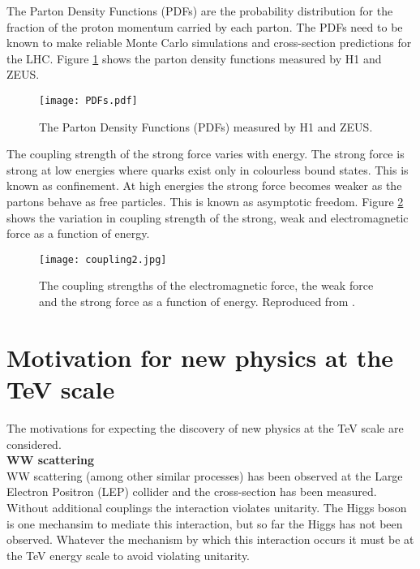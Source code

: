 The Parton Density Functions (PDFs) are the probability distribution for the
fraction of the proton momentum carried by each parton. The PDFs need to be
known to make reliable Monte Carlo simulations and cross-section predictions for 
the LHC. Figure \ref{fig:pdfs} shows the parton density functions measured by H1 and
ZEUS. \\

\begin{figure}
\begin{center}
\texttt{[image: PDFs.pdf]}
\end{center}
\caption{The Parton Density Functions (PDFs) measured by H1 and ZEUS.}
\label{fig:pdfs}
\end{figure}

The coupling strength of the strong force varies with energy. The strong force 
is strong at low energies where quarks exist only in colourless bound states. 
This is known as confinement. At high energies the strong force becomes weaker 
as the partons behave as free particles. This is known as asymptotic freedom. 
Figure \ref{fig:coupling} shows the variation in coupling strength of the 
strong, weak and electromagnetic force as a function of energy.

\begin{figure}
\begin{center}
\texttt{[image: coupling2.jpg]}
\end{center}
\caption{The coupling strengths of the electromagnetic force, the weak force and
the strong force as a function of energy. Reproduced from \cite{nobel_2004}.}
\label{fig:coupling}
\end{figure}

\section{Motivation for new physics at the TeV scale}

The motivations for expecting the discovery of new physics at the TeV scale are
considered. \\

{\bf WW scattering} \\

WW scattering (among other similar processes) has been observed at the Large 
Electron Positron (LEP) collider and the cross-section has been measured. 
Without additional couplings the interaction violates unitarity. The Higgs boson 
is one mechansim to mediate this interaction, but so far the Higgs has not been 
observed. Whatever the mechanism by which this interaction occurs it must be at 
the TeV energy scale to avoid violating unitarity. \\

